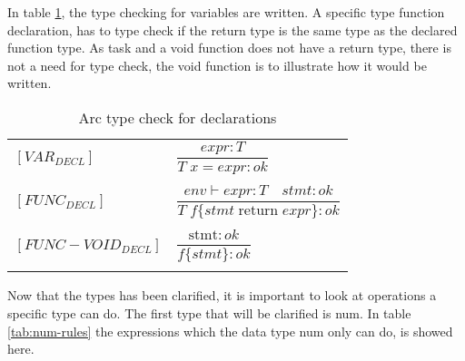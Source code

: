 In table \ref*{tab:DeclTypeCheck}, the type checking for variables are written. A specific type function declaration, has to type check if the return type is the same type as the declared function type. As task and a void function does not have a return type, there is not a need for type check, the void function is to illustrate how it would be written.

\begin{table}[htb!]
    \centering
    \begin{tabular}{ll}
        $[VAR_{DECL}] $       & $\dfrac
            {expr : T}
            {T \;x = expr : ok}$
        \\
        \\
        $[FUNC_{DECL}] $      & $\dfrac
            {env \vdash expr : T \quad stmt : ok}
            {T \;f \{stmt \;\text{return} \; expr\}  : ok}$
        \\
        \\
        $[FUNC-VOID_{DECL}] $ & $\dfrac
            {\text{stmt} : ok}
            {f\{stmt\}  : ok}$
        \\
        \\
    \end{tabular}
    \caption{Arc type check for declarations}
    \label{tab:DeclTypeCheck}
\end{table}

Now that the types has been clarified, it is important to look at operations a specific type can do.
The first type that will be clarified is num.
In table \ref{tab:num-rules} the expressions which the data type num only can do, is showed here.

